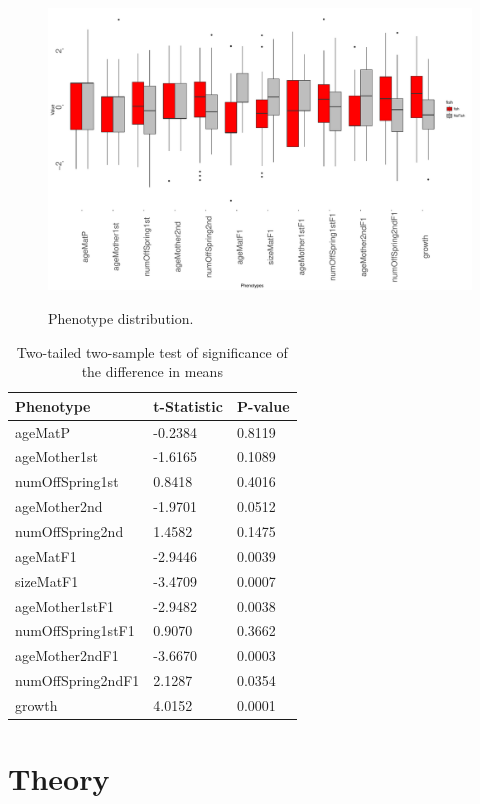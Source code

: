 \documentclass[a4paper]{article}
\begin{document}
\begin{figure}
\centering
\includegraphics[width = .9\textwidth]{boxplot.pdf}
\label{fig:boxplot}
\caption{Phenotype distribution.}
\end{figure}

\begin{table}
\caption{Two-tailed two-sample test of significance of the difference in means}
\label{tb:pval}
\begin{center}
\begin{tabular}{ |l|l|l| }
  \hline
  Phenotype & t-Statistic & P-value \\
  \hline
  ageMatP  &         -0.2384 &0.8119\\
ageMother1st    &  -1.6165 &0.1089\\
numOffSpring1st   & 0.8418 &0.4016\\
ageMother2nd     & -1.9701& 0.0512\\
numOffSpring2nd   & 1.4582& 0.1475\\
ageMatF1         & -2.9446& 0.0039\\
sizeMatF1       &  -3.4709& 0.0007\\
ageMother1stF1   & -2.9482& 0.0038\\
numOffSpring1stF1 & 0.9070& 0.3662\\
ageMother2ndF1   & -3.6670& 0.0003\\
numOffSpring2ndF1 & 2.1287& 0.0354\\
growth            & 4.0152& 0.0001\\
  \hline
\end{tabular}
\end{center}
\end{table}



\section{Theory}
\end{document}
